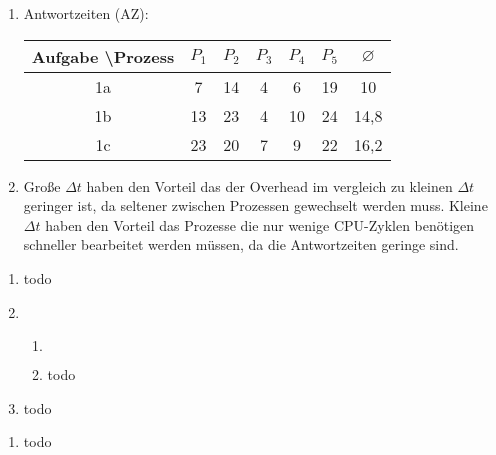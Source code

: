 \documentclass[ngerman]{fbi-aufgabenblatt}
\begin{document}
\begin{enumerate}
\begin{blockgraph}{31}{1}{0.4}
\end{blockgraph}

\item Antwortzeiten (AZ): \\
 \begin{tabular}{c||c|c|c|c|c|c}
  Aufgabe \textbackslash Prozess & $P_1$ & $P_2$ & $P_3$ & $P_4$ & $P_5$ & $\varnothing$ \\\hline\hline
    1a 				&  7   & 14 & 4 & 6  & 19 & 10 \\\hline
    1b 				&  13  & 23 & 4 & 10 & 24 & 14,8 \\\hline
    1c 				&  23  & 20 & 7 & 9  & 22 & 16,2 \\\hline
 \end{tabular}

\item Große $\Delta t$ haben den Vorteil das der Overhead im vergleich zu
kleinen $\Delta t$ geringer ist, da seltener zwischen Prozessen gewechselt werden muss.
Kleine $\Delta t$ haben den Vorteil das Prozesse die nur wenige CPU-Zyklen benötigen
schneller bearbeitet werden müssen, da die Antwortzeiten geringe sind.

\end{enumerate}


\begin{enumerate}
	\item
	todo
	\item
	\begin{enumerate}
	
	\item 
	$ $\\
	\begin{blockgraph}{28}{1}{0.4}

	
	\end{blockgraph}
	
	\item
	todo
	\end{enumerate}
	
	\item
	todo
\end{enumerate}


\begin{enumerate}
	\item
	todo
\end{enumerate}
\end{document}

